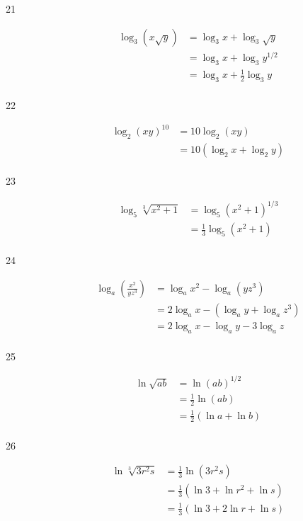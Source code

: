 \documentclass{exam}
\begin{document}
\begin{description}
      \item[21] 
        \begin{align*}
          \log_3 \left( x \sqrt{y} \right) &= \log_3 x + \log_3 \sqrt{y} \\
                                           &= \log_3 x + \log_3 y^{1/2} \\
                                           &= \log_3 x + \frac{1}{2} \log_3 y \\
        \end{align*}

      \item[22] 
        \begin{align*}
          \log_2 (xy)^{10} &= 10 \log_2 (xy) \\
                           &= 10 (\log_2 x + \log_2 y) \\
        \end{align*}

      \item[23] 
        \begin{align*}
          \log_5 \sqrt[3]{x^2 + 1} &= \log_5 \left( x^2 + 1 \right)^{1/3} \\
                                   &= \frac{1}{3} \log_5 \left( x^2 + 1 \right) \\
        \end{align*}

      \item[24] 
        \begin{align*}
          \log_a \left( \frac{x^2}{yz^3} \right) &= \log_a x^2 - \log_a \left( yz^3 \right) \\
                                                 &= 2 \log_a x - \left( \log_a y + \log_a z^3 \right) \\
                                                 &= 2 \log_a x - \log_a y - 3 \log_a z \\
        \end{align*}

      \item[25] 
        \begin{align*}
          \ln \sqrt{ab} &= \ln (ab)^{1/2} \\
                        &= \frac{1}{2} \ln (ab) \\
                        &= \frac{1}{2} (\ln a + \ln b) \\
        \end{align*}

      \item[26] 
        \begin{align*}
          \ln \sqrt[3]{3 r^2 s} &= \frac{1}{3} \ln \left( 3r^2s \right) \\
                                &= \frac{1}{3} \left( \ln 3 + \ln r^2 + \ln s \right) \\
                                &= \frac{1}{3} \left( \ln 3 + 2 \ln r + \ln s \right) \\
        \end{align*}


\end{description}
\end{document}
